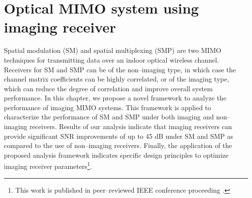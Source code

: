 \chapter[Optical spatial MIMO: System using imaging receiver]{Optical MIMO system using imaging receiver}
\label{chapter:mimoSpace}
\thispagestyle{myheadings}

Spatial modulation (SM) and spatial multiplexing (SMP) are two MIMO techniques for transmitting data over an indoor optical wireless channel. Receivers for SM and SMP can be of the non--imaging type, in which case the channel matrix coefficients can be highly correlated, or of the imaging type, which can reduce the degree of correlation and improve overall system performance. In this chapter, we propose a novel framework to analyze the performance of imaging MIMO systems. This framework is applied to characterize the performance of SM and SMP under both imaging and non--imaging receivers. Results of our analysis indicate that imaging receivers can provide significant SNR improvements of up to 45 dB under SM and SMP as compared to the use of non--imaging receivers. Finally, the application of the proposed analysis framework indicates specific design principles to optimize imaging receiver parameters\footnote{This work is published in peer--reviewed IEEE conference proceeding \cite{but14a}.}. 








\cleardoublepage